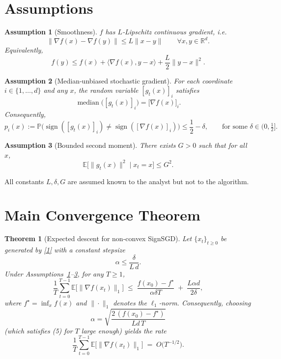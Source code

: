 \documentclass[11pt]{article}
\newtheorem{theorem}{Theorem}
\newtheorem{assumption}{Assumption}
\newcommand{\sign}{\operatorname{sign}}
\newcommand{\EE}{\mathbb{E}}
\newcommand{\PP}{\mathbb{P}}
\newcommand{\RR}{\mathbb{R}}
\begin{document}
\newpage
\section*{Assumptions}
\begin{assumption}[Smoothness]\label{ass:smooth}
$f$ has $L$‑Lipschitz continuous gradient, i.e.
\[
\|\nabla f(x)-\nabla f(y)\|\le L\|x-y\|\qquad\forall x,y\in\RR^{d}.
\]
Equivalently,
\[
f(y)\le f(x)+\langle\nabla f(x),y-x\rangle+\frac{L}{2}\|y-x\|^{2}.
\tag{2}
\]
\end{assumption}
\begin{assumption}[Median‑unbiased stochastic gradient]\label{ass:median}
For each coordinate $i\in\{1,\dots,d\}$ and any $x$, the random variable $[g_t(x)]_i$ satisfies
\[
\operatorname{median}\bigl([g_t(x)]_i\bigr)=\bigl[\nabla f(x)\bigr]_i .
\]
Consequently,
\[
p_i(x):=\PP\!\bigl(\sign([g_t(x)]_i)\neq\sign([\nabla f(x)]_i)\bigr)
\le\frac12-\delta,\qquad \text{for some }\delta\in(0,\tfrac12].
\tag{3}
\]
\end{assumption}
\begin{assumption}[Bounded second moment]\label{ass:var}
There exists $G>0$ such that for all $x$,
\[
\EE\!\bigl[\|g_t(x)\|^{2}\mid x_t=x\bigr]\le G^{2}.
\tag{4}
\]
\end{assumption}
All constants $L,\delta,G$ are assumed known to the analyst but not to the algorithm.

\section*{Main Convergence Theorem}
\begin{theorem}[Expected descent for non‑convex SignSGD]\label{thm:main}
Let $\{x_t\}_{t\ge0}$ be generated by \eqref{1} with a constant stepsize
\[
\alpha\le\frac{\delta}{L\,d}.
\tag{5}
\]
Under Assumptions~\ref{ass:smooth}–\ref{ass:var}, for any $T\ge1$,
\[
\frac{1}{T}\sum_{t=0}^{T-1}\EE\!\bigl[\|\nabla f(x_t)\|_{1}\bigr]
\;\le\;
\frac{f(x_0)-f^{\star}}{\alpha\delta T}
\;+\;
\frac{L\alpha d}{2\delta},
\tag{6}
\]
where $f^{\star}=\inf_{x}f(x)$ and $\|\cdot\|_{1}$ denotes the $\ell_{1}$‑norm.
Consequently, choosing
\[
\alpha = \sqrt{\frac{2\,(f(x_0)-f^{\star})}{L d\,T}}
\tag{7}
\]
(which satisfies (5) for $T$ large enough) yields the rate
\[
\frac{1}{T}\sum_{t=0}^{T-1}\EE\!\bigl[\|\nabla f(x_t)\|_{1}\bigr]
\;=\;O\!\bigl(T^{-1/2}\bigr).
\]
\end{theorem}
\end{document}
